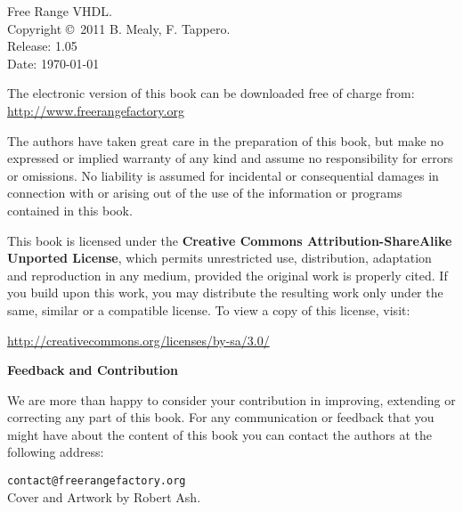 %
%
%
\setcounter{page}{1}

\small
\noindent
Free Range VHDL.\\
Copyright \copyright \ 2011 B. Mealy, F. Tappero.\\
Release: 1.05\\
Date: \today
\vspace{20pt}

\noindent
The electronic version of this book can be downloaded free of charge from:\\ 
\url{http://www.freerangefactory.org}\\

\vspace{20pt}

\noindent
The authors have taken great care in the preparation of this book, but make no expressed or implied warranty of any kind and assume no responsibility for errors or omissions. No liability is assumed for incidental or consequential damages in connection with or arising out of the use of the information or programs contained in this book.

\noindent
This book is licensed under the \textbf{Creative Commons Attribution-ShareAlike Unported License}, which permits unrestricted use, distribution, adaptation and reproduction in any medium, provided the original work is properly cited. If you build upon this work, you may distribute the resulting work only under the same, similar or a compatible license. To view a copy of this license, visit:
\vspace{5pt}

\noindent
\url{http://creativecommons.org/licenses/by-sa/3.0/}
\vspace{20pt}

\noindent
{\sffamily\bfseries Feedback and Contribution}

\noindent
We are more than happy to consider your contribution in improving, extending or correcting any part of this book.
For any communication or feedback that you might have about the content of this book you can contact the authors at the following address:
\vspace{2pt}

\noindent
\texttt{contact@freerangefactory.org}\\

\vfill
\noindent
Cover and Artwork by Robert Ash.



